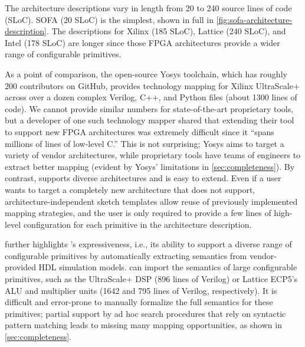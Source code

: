 The architecture descriptions
    vary in length from 20 to 240
    source lines of code (SLoC).
%
SOFA (20 SLoC) is the simplest, shown in full
  in \cref{fig:sofa-architecture-description}.
The descriptions for Xilinx (185 SLoC), 
  Lattice (240 SLoC), and Intel (178 SLoC)
  are longer since those
  FPGA architectures provide a
  wider range of configurable primitives.

As a point of comparison,
  the open-source Yosys toolchain,
  which has roughly 200 contributors on GitHub,
  provides technology mapping
  for Xilinx UltraScale+
  across over a dozen complex
  Verilog, C++, and Python files (about 1300
  lines of code).
We cannot provide similar numbers
  for state-of-the-art proprietary tools,
  but a developer
  of one such technology mapper
  shared that extending their tool to
  support new FPGA architectures
  was extremely difficult since it 
  ``spans millions of lines of low-level C.''
This is not surprising; Yosys aims to
  target a variety of vendor architectures, 
  while proprietary tools have teams of
  engineers to extract better mapping 
  (evident by Yosys' limitations
  in \cref{sec:completeness}).
By contrast,
  \lr supports
  diverse architectures and
  is easy to extend.
Even if a user
  wants to target a completely
  new architecture that
  \lr does not support,
  architecture-independent
  sketch templates allow reuse
  of previously implemented mapping
  strategies, and the user is
  only required to provide
  a few lines of
  high-level configuration
  for each primitive in 
  the architecture description.
  
 further
  highlights \lr's expressiveness,
  i.e., its ability to support a diverse
  range of configurable primitives
  by automatically extracting semantics from
  vendor-provided HDL simulation models.
\lr can import the semantics
  of large configurable primitives, 
  such as the UltraScale+ DSP (896 lines of Verilog)
  or Lattice ECP5's ALU and multiplier units (1642 and
  795 lines of Verilog, respectively).
It is difficult and error-prone
  to manually formalize the full semantics for these primitives;
  partial support by ad hoc search procedures
  that rely on syntactic pattern matching
  leads to missing many mapping opportunities,
  as shown in \cref{sec:completeness}.

